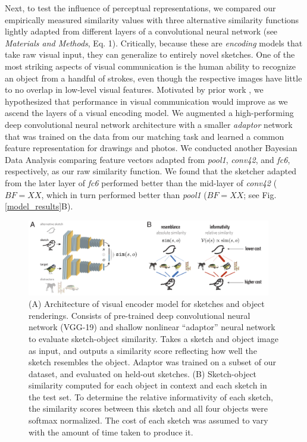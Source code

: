 \documentclass[9pt,twocolumn,twoside]{pnas-new}
\begin{document}
Next, to test the influence of perceptual representations, we compared our empirically measured similarity values with three alternative similarity functions lightly adapted from different layers of a convolutional neural network (see \emph{Materials and Methods}, Eq. 1). Critically, because these are \emph{encoding} models that take raw visual input, they can generalize to entirely novel sketches. One of the most striking aspects of visual communication is the human ability to recognize an object from a handful of strokes, even though the respective images have little to no overlap in low-level visual features. Motivated by prior work \cite{FanCommon2018}, we hypothesized that performance in visual communication would improve as we ascend the layers of a visual encoding model.  We augmented a high-performing deep convolutional neural network architecture with a smaller \emph{adaptor} network that was trained on the data from our matching task and learned a common feature representation for drawings and photos. We conducted another Bayesian Data Analysis comparing feature vectors adapted from \emph{pool1}, \emph{conv42}, and \emph{fc6}, respectively, as our raw similarity function. We found that the sketcher adapted from the later layer of \emph{fc6} performed better than the mid-layer of \emph{conv42} ($BF= XX$, which in turn performed better than \emph{pool1} ($BF = XX$; see Fig. \ref{model_results}B).

\begin{figure}[htbp]
\centering
\includegraphics[width=0.95\textwidth]{figures/4_model_schematic.pdf}
\caption{(A) Architecture of visual encoder model for sketches and object renderings. Consists of pre-trained deep convolutional neural network (VGG-19) and shallow nonlinear ``adaptor'' neural network to evaluate sketch-object similarity. Takes a sketch and object image as input, and outputs a similarity score reflecting how well the sketch resembles the object. Adaptor was trained on a subset of our dataset, and evaluated on held-out sketches. (B) Sketch-object similarity computed for each object in context and each sketch in the test set. To determine the relative informativity of each sketch, the similarity scores between this sketch and all four objects were softmax normalized. The cost of each sketch was assumed to vary with the amount of time taken to produce it.}
\label{model_schematic}
\end{figure}
\end{document}
